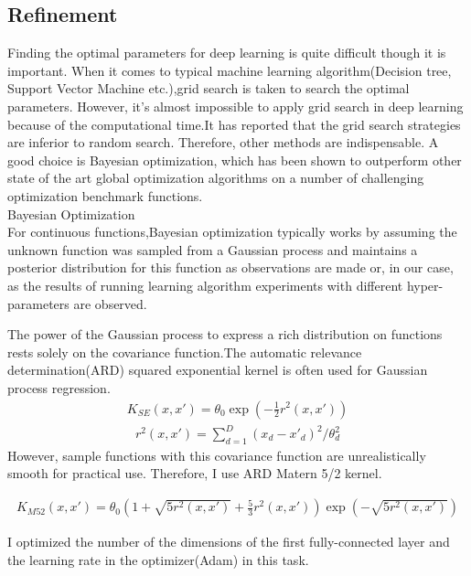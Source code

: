 \subsection{Refinement}

Finding the optimal parameters for deep learning is quite difficult though it is important. When it comes to typical machine learning algorithm(Decision tree, Support Vector Machine etc.),grid search is taken to search the optimal parameters. However, it's almost impossible to apply grid search in deep learning because of the computational time.It has reported that the grid search strategies are inferior to random search.\cite{Random} Therefore, other methods are indispensable. A good choice is Bayesian optimization, which has been shown to outperform other state of the art global optimization algorithms on a number of challenging optimization benchmark functions.\\

Bayesian Optimization\cite{Bayesian Optimization}\\

For continuous functions,Bayesian optimization typically works by assuming the unknown function was sampled from a Gaussian process and maintains a posterior distribution for this function as observations are made or, in our case, as the results of running learning algorithm experiments with different hyper-parameters are observed. 

The power of the Gaussian process to express a rich distribution on functions rests solely on the covariance function.The automatic relevance determination(ARD) squared exponential kernel is often used for Gaussian process regression.
\begin{eqnarray}
K_{SE}(x,x')=\theta_{0}\exp{(-\frac{1}{2}r^2(x,x'))} 
\end{eqnarray}
\begin{eqnarray}
r^2(x,x')=\sum^{D}_{d=1}(x_{d}-x'_{d})^2/\theta^2_{d}
\end{eqnarray}
However, sample functions with this covariance function are unrealistically smooth for practical use. Therefore,  I use ARD Matern 5/2 kernel.

\begin{eqnarray}
K_{M52}(x,x')=\theta_{0}(1+\sqrt{5r^2(x,x')}+\frac{5}{3}r^2(x,x'))\exp{(-\sqrt{5r^2(x,x')})}
\end{eqnarray}

I optimized the number of the dimensions of the first fully-connected layer and the learning rate in the optimizer(Adam) in this task.